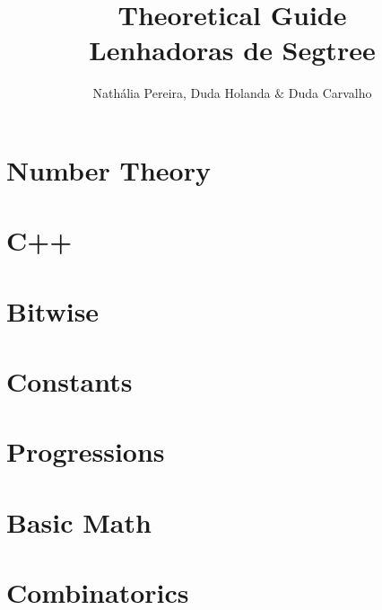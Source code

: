 \documentclass[10pt, twocolumn]{article}
\title{\vspace{-2cm}\textbf{Theoretical Guide\\Lenhadoras de Segtree}}
\author{Nathália Pereira, Duda Holanda $\&$ Duda Carvalho}
\date{}
\begin{document}
\maketitle
\tableofcontents\section{Number Theory}











\section{C++}


\section{Bitwise}




\section{Constants}

\section{Progressions}


\section{Basic Math}



\section{Combinatorics}


\end{document}
